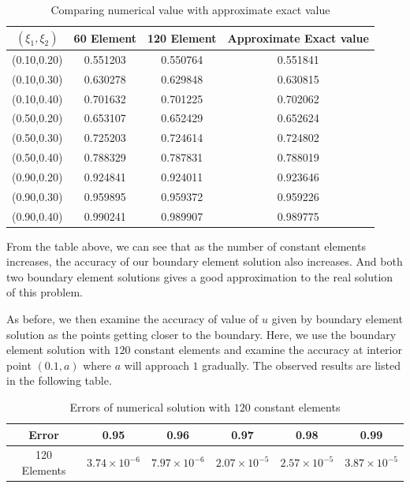 \documentclass[a4paper,12pt]{article}
\begin{document}
\begin{table}[H]
\centering
\begin{tabular}{@{}cccc@{}}
\toprule
    $(\xi_1,\xi_2)$        & 60 Element & 120 Element & Approximate Exact value \\ \midrule
(0.10,0.20) & 0.551203   & 0.550764   & 0.551841    \\
(0.10,0.30) & 0.630278   & 0.629848   & 0.630815    \\
(0.10,0.40) & 0.701632   & 0.701225   & 0.702062    \\
(0.50,0.20) & 0.653107   & 0.652429   & 0.652624    \\
(0.50,0.30) & 0.725203   & 0.724614   & 0.724802    \\
(0.50,0.40) & 0.788329   & 0.787831   & 0.788019    \\
(0.90,0.20) & 0.924841   & 0.924011   & 0.923646    \\
(0.90,0.30) & 0.959895   & 0.959372   & 0.959226    \\
(0.90,0.40) & 0.990241   & 0.989907   & 0.989775    \\ \bottomrule
\end{tabular}
\caption{Comparing numerical value with approximate exact value}
\label{tab:my-table}
\end{table} 

\par From the table above, we can see that as the number of constant elements increases, the accuracy of our boundary element solution also increases. And both two boundary element solutions gives a good approximation to the real solution of this problem. 

\par As before, we then examine the accuracy of value of $u$ given by boundary element solution as the points getting closer to the boundary. Here, we use the boundary element solution with $120$ constant elements and examine the accuracy at interior point $(0.1,a)$ where $a$ will approach $1$ gradually. The observed results are listed in the following table. 

\begin{table}[H]
\centering
\begin{tabular}{@{}cccccc@{}}
\toprule
Error       & 0.95        & 0.96        & 0.97        & 0.98        & 0.99       \\ \midrule
120 Elements & $3.74 \times 10^{-6}$ & $7.97 \times 10^{-6}$ &  $2.07 \times 10^{-5}$ &  $2.57 \times 10^{-5}$ &  $3.87 \times 10^{-5}$ \\ \bottomrule
\end{tabular}
\caption{Errors of numerical solution with $120$ constant elements}
\label{tab:my-table}
\end{table}
\end{document}
